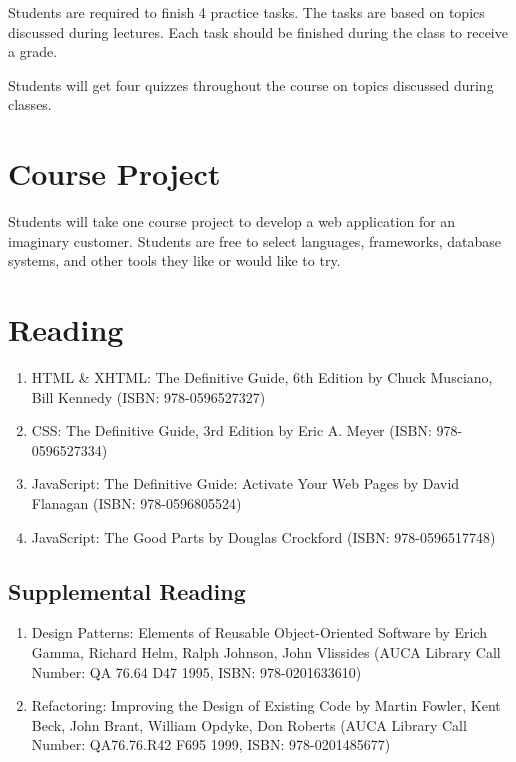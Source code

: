 \documentclass[12pt,a4paper,oneside]{article}
\begin{document}
        Students are required to finish 4 practice tasks. The tasks are based on
        topics discussed during lectures. Each task should be finished during
        the class to receive a grade.

        Students will get four quizzes throughout the course on topics discussed
        during classes.

    \section{Course Project}

        Students will take one course project to develop a web application for
        an imaginary customer. Students are free to select languages,
        frameworks, database systems, and other tools they like or would like to
        try.

    \section{Reading}

        \begin{enumerate}
            \item HTML \& XHTML: The Definitive Guide, 6th Edition by Chuck
            Musciano, Bill Kennedy (ISBN: 978-0596527327)
            \item CSS: The Definitive Guide, 3rd Edition by Eric A. Meyer (ISBN:
            978-0596527334)
            \item JavaScript: The Definitive Guide: Activate Your Web Pages by
            David Flanagan (ISBN: 978-0596805524)
            \item JavaScript: The Good Parts by Douglas Crockford (ISBN:
            978-0596517748)
        \end{enumerate}

        \subsection{Supplemental Reading}

            \begin{enumerate}
                \item Design Patterns: Elements of Reusable Object-Oriented
                Software by Erich Gamma, Richard Helm, Ralph Johnson, John
                Vlissides (AUCA Library Call Number: QA 76.64 D47 1995, ISBN:
                978-0201633610)
                \item Refactoring: Improving the Design of Existing Code by
                Martin Fowler, Kent Beck, John Brant, William Opdyke, Don
                Roberts (AUCA Library Call Number: QA76.76.R42 F695 1999, ISBN:
                978-0201485677)
            \end{enumerate}
\end{document}
